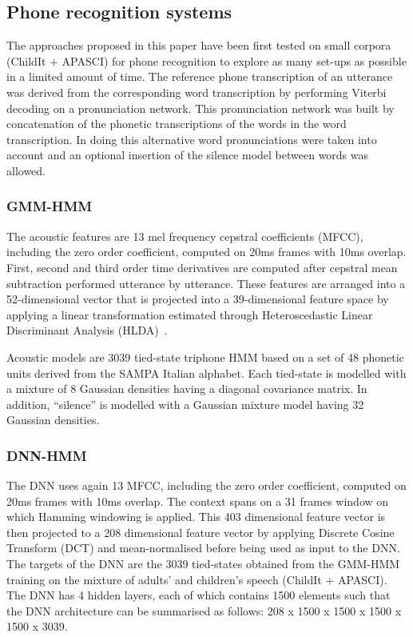 \documentclass{nle}
\begin{document}
\subsection{Phone recognition systems}
The approaches proposed in this paper have been first tested on small
corpora (ChildIt + APASCI) for phone recognition to explore as many
set-ups as possible in a limited amount of time.  The
reference phone transcription of an utterance was derived from the
corresponding word transcription by performing Viterbi decoding on a
pronunciation network.  This pronunciation network was built by
concatenation of the phonetic transcriptions of the words in the word
transcription.  In doing this alternative word pronunciations were
taken into account and an optional insertion of the silence model
between words was allowed.

\subsubsection{GMM-HMM}\label{sssection:base}

The  acoustic  features are  13  mel  frequency cepstral  coefficients
(MFCC), including the zero order coefficient, computed on 20ms frames
with 10ms overlap.  First, second and third order time derivatives are
computed  after  cepstral  mean  subtraction  performed  utterance  by
utterance.  These  features are arranged into  a 52-dimensional vector
that is  projected into a  39-dimensional feature space by  applying a
linear   transformation  estimated   through   Heteroscedastic  Linear
Discriminant Analysis (HLDA)~\citep*{Kumar1998283}.

Acoustic models  are 3039 tied-state  triphone HMM
based on  a set of  48 phonetic units  derived from the  SAMPA Italian
alphabet.  Each  tied-state  is modelled with  a mixture of  8 Gaussian
densities   having  a  diagonal   covariance  matrix.    In  addition,
``silence''  is  modelled  with  a  Gaussian mixture  model  having  32
Gaussian densities.

\subsubsection{DNN-HMM}\label{sssection:exp:DNN}
The DNN  uses again  13 MFCC, including  the zero  order coefficient,
computed on 20ms  frames with 10ms overlap. The context  spans on a 31
frames  window  on  which  Hamming  windowing is  applied.   This  403
dimensional  feature vector  is then  projected to  a  208 dimensional
feature  vector  by  applying  Discrete  Cosine  Transform  (DCT)  and
mean-normalised before being used as input  to the DNN.  The targets of the
DNN are the 3039 tied-states obtained from the GMM-HMM training on the
mixture of adults'  and children's speech (ChildIt +  APASCI). The DNN
has 4  hidden layers, each of  which contains 1500  elements such that
the DNN architecture can be summarised as follows: 208 x 1500 x 1500 x
1500 x 1500 x 3039.
\end{document}

